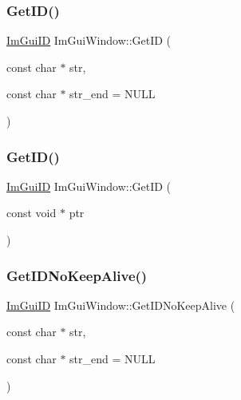 \mbox{\label{struct_im_gui_window_a66400a63bc0b54d7d29e08d1b1b1a42b}} 
\subsubsection{\texorpdfstring{Get\+I\+D()}{GetID()}\hspace{0.1cm}{\footnotesize\ttfamily [1/2]}}
{\footnotesize\ttfamily \mbox{\hyperlink{imgui_8h_a1785c9b6f4e16406764a85f32582236f}{Im\+Gui\+ID}} Im\+Gui\+Window\+::\+Get\+ID (\begin{DoxyParamCaption}\item[{const char $\ast$}]{str,  }\item[{const char $\ast$}]{str\+\_\+end = {\ttfamily NULL} }\end{DoxyParamCaption})}

\mbox{\label{struct_im_gui_window_aae21dffb343cabca9414499b827912a8}} 
\subsubsection{\texorpdfstring{Get\+I\+D()}{GetID()}\hspace{0.1cm}{\footnotesize\ttfamily [2/2]}}
{\footnotesize\ttfamily \mbox{\hyperlink{imgui_8h_a1785c9b6f4e16406764a85f32582236f}{Im\+Gui\+ID}} Im\+Gui\+Window\+::\+Get\+ID (\begin{DoxyParamCaption}\item[{const void $\ast$}]{ptr }\end{DoxyParamCaption})}

\mbox{\label{struct_im_gui_window_adc0a43f74a0b53a15a4bc4fea05524fe}} 
\subsubsection{\texorpdfstring{Get\+I\+D\+No\+Keep\+Alive()}{GetIDNoKeepAlive()}}
{\footnotesize\ttfamily \mbox{\hyperlink{imgui_8h_a1785c9b6f4e16406764a85f32582236f}{Im\+Gui\+ID}} Im\+Gui\+Window\+::\+Get\+I\+D\+No\+Keep\+Alive (\begin{DoxyParamCaption}\item[{const char $\ast$}]{str,  }\item[{const char $\ast$}]{str\+\_\+end = {\ttfamily NULL} }\end{DoxyParamCaption})}

